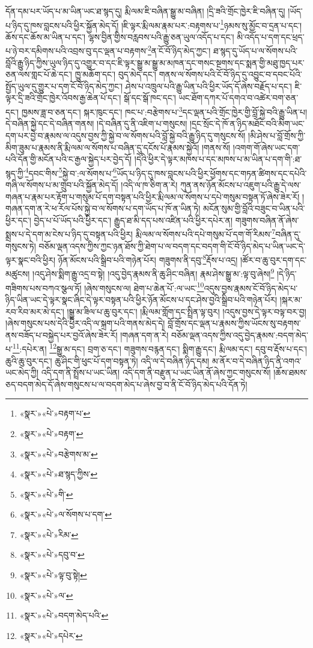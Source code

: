 དོན་དམ་པར་ཡོད་པ་མ་ཡིན་ཡང་ཐ་སྙད་དུ། རྨི་ལམ་ཇི་བཞིན་སྒྱུ་མ་བཞིན། །དྲི་ཟའི་གྲོང་ཁྱེར་ཇི་བཞིན་དུ། །ཡོད་པ་ཉིད་དུ་ཁས་བླངས་པའི་ཕྱིར་སྐྱོན་མེད་དོ། །ཇི་ལྟར་རྨི་ལམ་རྣམ་པར་:བརྟགས་པ་\footnote{«སྣར་»«པེ་»བརྟག་པ་}ཉམས་སུ་མྱོང་བ་དྲན་པ་དང་། ཆོས་དང་ཆོས་མ་ཡིན་པ་དང་། ལྷས་བྱིན་གྱིས་བརླབས་པའི་རྒྱུ་ཅན་ཡུལ་འདོད་པ་དང་། མི་འདོད་པ་དག་དང་ཕྲད་པ་ཉེ་བར་དམིགས་པའི་འབྲས་བུ་དང་ལྡན་པ་བརྟགས་\footnote{«སྣར་»«པེ་»བརྟག་}ན་ངོ་བོ་ཉིད་མེད་ཀྱང་། ཐ་སྙད་དུ་ཡོད་པ་ལ་སོགས་པའི་བློའི་རྒྱུ་ཉིད་ཀྱིས་ཡུལ་ཉིད་དུ་འགྱུར་བ་དང་ཇི་ལྟར་སྒྱུ་མ་སྒྱུ་མ་མཁན་དང་གསང་སྔགས་དང་སྨན་གྱི་མཐུ་ཁྱད་པར་ཅན་ལས་གླང་པོ་ཆེ་དང་། ཁྱུ་མཆོག་དང་། བུད་མེད་དང་། གནས་ལ་སོགས་པའི་ངོ་བོ་ཉིད་དུ་འབྱུང་བ་དབང་པོའི་སྤྱོད་ཡུལ་དུ་གྱུར་པ་དག་ངོ་བོ་ཉིད་མེད་ཀྱང་། ཤེས་པ་འཁྲུལ་པའི་རྒྱུ་ཡིན་པའི་ཕྱིར་ཡོད་དོ་ཞེས་བརྗོད་པ་དང་། ཇི་ལྟར་དྲི་ཟའི་གྲོང་ཁྱེར་འོབས་རྒྱ་ཆེན་པོ་དང་། སྒོ་དང་སྒོ་ཁང་དང་། ཡང་ཐོག་དཀར་པོ་དགའ་བ་འཚེར་བག་ཅན་དང་། ཁྱམས་ཟླ་བ་ཅན་དང་། སྐར་ཁུང་དང་། ཁང་པ་:བརྩེགས་པ་\footnote{«སྣར་»«པེ་»བརྩེགས་མ་}དང་ལྡན་པའི་གྲོང་ཁྱེར་གྱི་བློ་སྐྱེ་བའི་རྒྱུ་ཡིན་པ། དེ་བཞིན་སྐྱེ་དང་དེ་བཞིན་གནས། །དེ་བཞིན་དུ་ནི་འཇིག་པ་གསུངས། །དྲང་སྲོང་དེ་ཁོ་ན་ཉིད་མཐོང་བའི་མིག་ཡང་དག་པར་བྱེ་བ་རྣམས་ལ་འདུས་བྱས་ཀྱི་སྐྱེ་བ་ལ་སོགས་པའི་བློ་སྐྱེ་བའི་རྒྱུ་ཉིད་དུ་གསུངས་སོ། །མི་ཤེས་པ་བློ་གྲོས་ཀྱི་མིག་ཟུམ་པ་རྣམས་ནི་རྨི་ལམ་ལ་སོགས་པ་བཞིན་དུ་དངོས་པོ་རྣམས་སྐྱེའོ། །གནས་སོ། །འགག་གོ་ཞེས་ཡང་དག་པའི་དོན་གྱི་མངོན་པའི་ང་རྒྱལ་སྐྱེད་པར་བྱེད་དོ། །དེའི་ཕྱིར་དེ་ལྟར་མཁས་པ་དང་མཁས་པ་མ་ཡིན་པ་དག་གི་:ཐ་སྙད་ཀྱི་\footnote{«སྣར་»«པེ་»ཐ་སྙད་ཀྱིས་}དབང་གིས་\footnote{«སྣར་»«པེ་»གི་}སྐྱེ་བ་:ལ་སོགས་པ་\footnote{«སྣར་»«པེ་»ལ་སོགས་པ་དག་}ཡོད་པ་ཉིད་དུ་ཁས་བླངས་པའི་ཕྱིར་ཕྱོགས་དང་གཏན་ཚིགས་དང་དཔེའི་གཞི་ལ་སོགས་པ་མ་གྲུབ་པའི་སྐྱོན་མེད་དོ། །འདི་ལ་ཁ་ཅིག་ན་རེ། ཀུན་ནས་ཉོན་མོངས་པ་འཇུག་པའི་རྒྱུ་དེ་ལས་གཞན་པ་རྣམ་པར་རྟོག་པ་གསུམ་པོ་དག་བསྟན་པའི་ཕྱིར་རྨི་ལམ་ལ་སོགས་པ་དཔེ་གསུམ་བསྟན་ཏོ་ཞེས་ཟེར་རོ། །གཞན་དག་ན་རེ་ཕ་རོལ་པོས་སྐྱེ་བ་ལ་སོགས་པ་དག་ཡོད་པ་ཁོ་ན་ཡིན་ཏེ། མངོན་སུམ་གྱི་བློའི་བཟུང་བ་ཡིན་པའི་ཕྱིར་དང་། བྱེད་པ་པོ་ཡོད་པའི་ཕྱིར་དང་། རྒྱུད་ཐ་མི་དད་པས་འཛིན་པའི་ཕྱིར་དཔེར་ན། གཟུགས་བཞིན་ནོ་ཞེས་སྨྲས་པ་དེ་དག་མ་ངེས་པ་ཉིད་དུ་བསྟན་པའི་ཕྱིར། རྨི་ལམ་ལ་སོགས་པའི་དཔེ་གསུམ་པོ་དག་གོ་རིམས་\footnote{«སྣར་»«པེ་»རིམ་}བཞིན་དུ་གསུངས་ཏེ། བཅོམ་ལྡན་འདས་ཀྱིས་ཀྱང་ཉན་ཐོས་ཀྱི་ཐེག་པ་ལ་བདག་དང་བདག་གི་ངོ་བོ་ཉིད་མེད་པ་ཡིན་ཡང་དེ་ལྟར་སྣང་བའི་ཕྱིར། ཉོན་མོངས་པའི་སྒྲིབ་པའི་གཉེན་པོར། གཟུགས་ནི་དབུ་\footnote{«སྣར་»«པེ་»དབུ་བ་}རྡོས་པ་འདྲ། །ཚོར་བ་ཆུ་བུར་དག་དང་མཚུངས། །འདུ་ཤེས་སྨིག་རྒྱུ་འདྲ་བ་སྟེ། །འདུ་བྱེད་རྣམས་ནི་ཆུ་ཤིང་བཞིན། རྣམ་ཤེས་སྒྱུ་མ་:ལྟ་བུ་ཞེས།\footnote{«སྣར་»«པེ་»ལྟ་བུ་སྟེ།} །དེ་ཉིད་གཟིགས་པས་བཀའ་སྩལ་ཏོ། །ཞེས་གསུངས་ལ། ཐེག་པ་ཆེན་པོ་:ལ་ཡང་\footnote{«སྣར་»«པེ་»ལ་}འདུས་བྱས་རྣམས་ངོ་བོ་ཉིད་མེད་པ་ཉིད་ཡིན་ཡང་དེ་ལྟར་སྣང་ཞིང་དེ་ལྟར་བསྟན་པའི་ཕྱིར་ཉོན་མོངས་པ་དང་ཤེས་བྱའི་སྒྲིབ་པའི་གཉེན་པོར། །སྐར་མ་རབ་རིབ་མར་མེ་དང་། །སྒྱུ་མ་ཟིལ་པ་ཆུ་བུར་དང་། །རྨི་ལམ་གློག་དང་སྤྲིན་ལྟ་བུར། །འདུས་བྱས་དེ་ལྟར་བལྟ་བར་བྱ། །ཞེས་གསུངས་པས་དེའི་ཕྱིར་འདི་ལ་སྐྲག་པའི་གནས་མེད་དེ། བློ་གྲོས་དང་ལྡན་པ་རྣམས་ཀྱིས་ཡོངས་སུ་བརྟགས་ནས་བཟོད་པ་བསྐྱེད་པར་བྱའོ་ཞེས་ཟེར་རོ། །གཞན་དག་ན་རེ། བཅོམ་ལྡན་འདས་ཀྱིས་འདུ་བྱེད་རྣམས་:བདག་མེད་པ་\footnote{«སྣར་»«པེ་»བདག་མེད་པའི་}:དཔེར་ན། \footnote{«སྣར་»«པེ་»དཔེར་}སྒྱུ་མ་དང་། བྲག་ཅ་དང་། གཟུགས་བརྙན་དང་། སྨིག་རྒྱུ་དང་། རྨི་ལམ་དང་། དབུ་བ་རྡོས་པ་དང་། ཆུའི་ཆུ་བུར་དང་། ཆུ་ཤིང་གི་ཕུང་པོ་དག་བསྟན་ཏེ། འདི་ལ་དེ་བཞིན་ཉིད་དམ། མ་ནོར་བ་དེ་བཞིན་ཉིད་ནི་འགའ་ཡང་མེད་ཀྱི། འདི་དག་ནི་སྤྲོས་པ་ཡང་ཡིན། འདི་དག་ནི་བརྫུན་པ་ཡང་ཡིན་ནོ་ཞེས་ཀྱང་གསུངས་སོ། །ཆོས་ཐམས་ཅད་བདག་མེད་དོ་ཞེས་གསུངས་པ་ལ་བདག་མེད་པ་ཞེས་བྱ་བ་ནི་ངོ་བོ་ཉིད་མེད་པའི་དོན་ཏེ། 